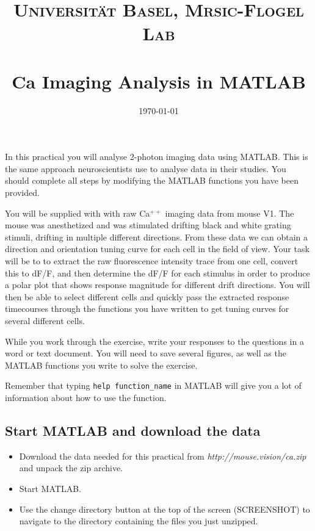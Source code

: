 \documentclass[paper=a4, fontsize=11pt]{scrartcl} %
\title{	
\normalfont \normalsize 
\textsc{Universit\"{a}t Basel, Mrsic-Flogel Lab} \\ [25pt] %
\horrule{0.5pt} \\[0.2cm] %
\huge Ca\supr{++} Imaging Analysis in MATLAB
\horrule{1.5pt}\\ %
}
\author{}
\date{\normalsize\today} %
\numberwithin{equation}{section} %
\numberwithin{figure}{section} %
\numberwithin{table}{section} %
\newcommand{\supr}[1]{\ensuremath{^{#1}}}
\begin{document}
\maketitle %

In this practical you will analyse 2-photon imaging data using MATLAB. This is the same approach 
neuroscientists use to analyse data in their studies. You should complete all steps by modifying the 
MATLAB functions you have been provided.


You will be supplied with with raw Ca\supr{++} imaging data from mouse V1. The mouse 
was anesthetized and was stimulated drifting black and white grating stimuli, drifting in multiple different directions. From these data
we can obtain a direction and orientation tuning curve for each cell in the field of view. Your task will be to to 
extract the raw fluorescence intensity trace from one cell, convert this to dF/F, and then 
determine the dF/F for each stimulus in order to produce a polar plot that shows response magnitude
for different drift directions. You will then be able to select different cells and quickly pass the extracted 
response timecourses through the functions you have written to get tuning curves for several 
different cells. 


While you work through the exercise, write your responses to the questions in a word or text document. You will need to save several figures, as well as the MATLAB functions you write to solve the exercise.


Remember that typing \texttt{help function\_name} in MATLAB will give you a lot of information about how to use the function.

\subsection{Start MATLAB and download the data}
\begin{itemize}
\setlength{\parskip}{0.25em}
\item Download the data needed for this practical from \textit{http://mouse.vision/ca.zip} and unpack the zip archive. 
\item Start MATLAB.
\item Use the change directory button at the top of the screen (SCREENSHOT) to navigate to the 
directory containing the files you just unzipped. 
\end{itemize}
\end{document}
